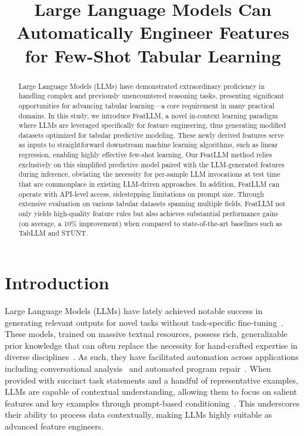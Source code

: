 \title{Large Language Models Can Automatically Engineer Features for Few-Shot Tabular Learning}

\begin{abstract}
Large Language Models (LLMs) have demonstrated extraordinary proficiency in handling complex and previously unencountered reasoning tasks, presenting significant opportunities for advancing tabular learning—a core requirement in many practical domains. In this study, we introduce \textsf{FeatLLM}, a novel in-context learning paradigm where LLMs are leveraged specifically for feature engineering, thus generating modified datasets optimized for tabular predictive modeling. These newly derived features serve as inputs to straightforward downstream machine learning algorithms, such as linear regression, enabling highly effective few-shot learning. Our \textsf{FeatLLM} method relies exclusively on this simplified predictive model paired with the LLM-generated features during inference, obviating the necessity for per-sample LLM invocations at test time that are commonplace in existing LLM-driven approaches. In addition, \textsf{FeatLLM} can operate with API-level access, sidestepping limitations on prompt size. Through extensive evaluation on various tabular datasets spanning multiple fields, \textsf{FeatLLM} not only yields high-quality feature rules but also achieves substantial performance gains (on average, a 10\% improvement) when compared to state-of-the-art baselines such as TabLLM and STUNT.
\end{abstract}

\section{Introduction}
Large Language Models (LLMs) have lately achieved notable success in generating relevant outputs for novel tasks without task-specific fine-tuning~\cite{creswell2022selection,imani2023mathprompter,taylor2022galactica}. These models, trained on massive textual resources, possess rich, generalizable prior knowledge that can often replace the necessity for hand-crafted expertise in diverse disciplines~\cite{Genomes2021,singhal2023large,wilcox2003role}. As such, they have facilitated automation across applications including conversational analysis~\cite{finch2023leveraging} and automated program repair~\cite{fan2023automated}. When provided with succinct task statements and a handful of representative examples, LLMs are capable of contextual understanding, allowing them to focus on salient features and key examples through prompt-based conditioning~\cite{brown2020language,zhao2023survey}. This underscores their ability to process data contextually, making LLMs highly suitable as advanced feature engineers.

